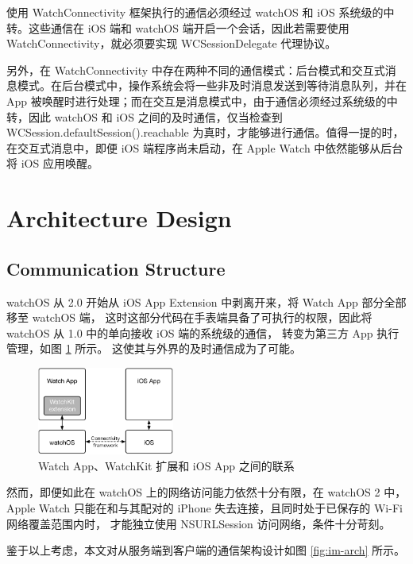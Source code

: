 使用 WatchConnectivity 框架执行的通信必须经过 watchOS 和 iOS 系统级的中转。这些通信在 iOS 端和 watchOS 端开启一个会话，因此若需要使用 WatchConnectivity，就必须要实现 WCSessionDelegate 代理协议。

另外，在 WatchConnectivity 中存在两种不同的通信模式：后台模式和交互式消息模式。在后台模式中，操作系统会将一些非及时消息发送到等待消息队列，并在 App 被唤醒时进行处理；而在交互是消息模式中，由于通信必须经过系统级的中转，因此 watchOS 和 iOS 之间的及时通信，仅当检查到 WCSession.defaultSession().reachable 为真时，才能够进行通信。值得一提的时，在交互式消息中，即便 iOS 端程序尚未启动，在 Apple Watch 中依然能够从后台将 iOS 应用唤醒。

\section{Architecture Design}
\label{sec:arch-design}

\subsection{Communication Structure}
\label{sub:im-arch}

watchOS 从 2.0 开始从 iOS App Extension 中剥离开来，将 Watch App 部分全部移至 watchOS 端，
这时这部分代码在手表端具备了可执行的权限，因此将 watchOS 从 1.0 中的单向接收 iOS 端的系统级的通信，
转变为第三方 App 执行管理\cite{WatchGuide:2016}，如图 \ref{fig:watch-phone} 所示。
这使其与外界的及时通信成为了可能。

\begin{figure}[H]
    \kaishu
    \centering
    \includegraphics[width=0.4\textwidth]{figures/watch-phone}
    \caption{\kaishu Watch App、WatchKit 扩展和 iOS App 之间的联系}
    \label{fig:watch-phone}
\end{figure}

然而，即便如此在 watchOS 上的网络访问能力依然十分有限，在 watchOS 2 中，
Apple Watch 只能在和与其配对的 iPhone 失去连接，且同时处于已保存的 Wi-Fi 网络覆盖范围内时，
才能独立使用 NSURLSession 访问网络，条件十分苛刻。

鉴于以上考虑，本文对从服务端到客户端的通信架构设计如图 \ref{fig:im-arch} 所示。

